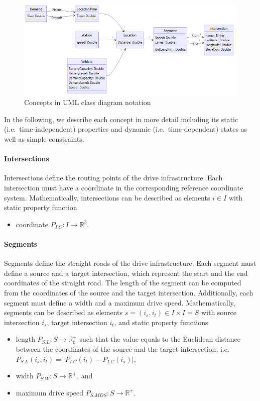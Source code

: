 \documentclass{IEEEtran}
\begin{document}
    \begin{figure}[t]
        \centering
        \includegraphics[scale=0.5]{../../diagrams/model/classes-v0.png}
        \caption{Concepts in UML class diagram notation}
        \label{fig:concepts}
    \end{figure}

    In the following, we describe each concept in more detail including its static (i.e.\ time-independent) properties and dynamic (i.e.\ time-dependent) states as well as simple constraints.

    \paragraph{Intersections}
    Intersections define the routing points of the drive infrastructure.
    Each intersection must have a coordinate in the corresponding reference coordinate system.
    Mathematically, intersections can be described as elements $i \in I$ with static property function
    \begin{itemize}
        \item coordinate $P_{I.C}: I \rightarrow \mathbb{R}^3$.
    \end{itemize}

    \paragraph{Segments}
    Segments define the straight roads of the drive infrastructure.
    Each segment must define a source and a target intersection, which represent the start and the end coordinates of the straight road.
    The length of the segment can be computed from the coordinates of the source and the target intersection.
    Additionally, each segment must define a width and a maximum drive speed.
    Mathematically, segments can be described as elements $s = (i_s, i_t) \in I \times I = S$ with source intersection $i_s$, target intersection $i_t$, and static property functions
    \begin{itemize}
        \item length $P_{S.L}: S \rightarrow \mathbb{R}_0^+$ such that the value equals to the Euclidean distance between the coordinates of the source and the target intersection, i.e.\ $P_{S.L}(i_s, i_t) = |P_{I.C}(i_t) - P_{I.C}(i_s)|$,
        \item width $P_{S.W}: S \rightarrow \mathbb{R}^+$, and
        \item maximum drive speed $P_{S.MDS}: S \rightarrow \mathbb{R}^+$.
    \end{itemize}
\end{document}
